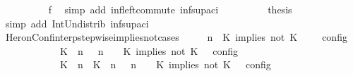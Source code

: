 \begin{isabellebody}
\ \ \ \ \ \ \ \ \isamarkupfalse%
\ f{}\ \isamarkupfalse%
\ {\isacharparenleft}simp\ add{\isacharcolon}\ inf{\isacharunderscore}left{\isacharunderscore}commute\ inf{\isacharunderscore}sup{\isacharunderscore}aci{\isacharparenleft}{}{\isacharparenright}{\isacharparenright}\isanewline
\ \ \ \ \ \ \isamarkupfalse%
\ \isamarkupfalse%
\ {\isacharquery}thesis\isanewline
\ \ \ \ \ \ \ \ \isamarkupfalse%
\ {\isacharparenleft}simp\ add{\isacharcolon}\ Int{\isacharunderscore}Un{\isacharunderscore}distrib{}\ inf{\isacharunderscore}sup{\isacharunderscore}aci{\isacharparenleft}{}{\isacharparenright}{\isacharparenright}\isanewline
\ \ \ \ \isamarkupfalse%
\isanewline
\ \ \isamarkupfalse%
%
\endisatagproof
{\isafoldproof}%
%
\isadelimproof
\isanewline
%
\endisadelimproof
\isanewline
{}\isamarkupfalse%
\ HeronConf{\isacharunderscore}interp{\isacharunderscore}stepwise{\isacharunderscore}implies{\isacharunderscore}not{\isacharunderscore}cases{\isacharcolon}\isanewline
\ \ \ {\isacartoucheopen}{\isasymlbrakk}\ {\isasymGamma}{\isacharcomma}\ n\ {\isasymturnstile}\ {\isacharparenleft}{\isacharparenleft}K\ implies\ not\ K\ {\isacharhash}\ {\isasymPsi}{\isacharparenright}\ {\isasymtriangleright}\ {\isasymPhi}\ {\isasymrbrakk}\isactrlsub c\isactrlsub o\isactrlsub n\isactrlsub f\isactrlsub i\isactrlsub g\isanewline
\ \ \ \ \ \ \ \ \ \ {\isacharequal}\ {\isasymlbrakk}\ {\isacharparenleft}{\isacharparenleft}K\ {\isasymnot}{\isasymUp}\ n{\isacharparenright}\ {\isacharhash}\ {\isasymGamma}{\isacharparenright}{\isacharcomma}\ n\ {\isasymturnstile}\ {\isasymPsi}\ {\isasymtriangleright}\ {\isacharparenleft}{\isacharparenleft}K\ implies\ not\ K\ {\isacharhash}\ {\isasymPhi}{\isacharparenright}\ {\isasymrbrakk}\isactrlsub c\isactrlsub o\isactrlsub n\isactrlsub f\isactrlsub i\isactrlsub g\isanewline
\ \ \ \ \ \ \ \ \ \ {\isasymunion}\ {\isasymlbrakk}\ {\isacharparenleft}{\isacharparenleft}K\ {\isasymUp}\ n{\isacharparenright}\ {\isacharhash}\ {\isacharparenleft}K\ {\isasymnot}{\isasymUp}\ n{\isacharparenright}\ {\isacharhash}\ {\isasymGamma}{\isacharparenright}{\isacharcomma}\ n\ {\isasymturnstile}\ {\isasymPsi}\ {\isasymtriangleright}\ {\isacharparenleft}{\isacharparenleft}K\ implies\ not\ K\ {\isacharhash}\ {\isasymPhi}{\isacharparenright}\ {\isasymrbrakk}\isactrlsub c\isactrlsub o\isactrlsub n\isactrlsub f\isactrlsub i\isactrlsub g{\isacartoucheclose}\isanewline

\end{isabellebody}
